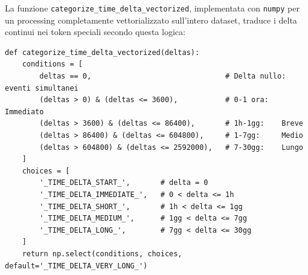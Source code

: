 \begin{enumerate}
    \begin{table}[htbp]
        \centering
        \caption{Distribuzione empirica dei delta temporali nel dataset e corrispondente token di discretizzazione assegnato.}
        \label{tab:time_delta_distribution}
    \end{table}
    \FloatBarrier

    La funzione \texttt{categorize\_time\_delta\_vectorized}, implementata con \texttt{numpy} per un processing completamente vettorializzato sull'intero dataset, traduce i delta continui nei token speciali secondo questa logica:

\begin{verbatim}
def categorize_time_delta_vectorized(deltas):
    conditions = [
        deltas == 0,                               # Delta nullo: eventi simultanei
        (deltas > 0) & (deltas <= 3600),           # 0-1 ora:   Immediato
        (deltas > 3600) & (deltas <= 86400),       # 1h-1gg:    Breve
        (deltas > 86400) & (deltas <= 604800),     # 1-7gg:     Medio
        (deltas > 604800) & (deltas <= 2592000),   # 7-30gg:    Lungo
    ]
    choices = [
        '_TIME_DELTA_START_',       # delta = 0
        '_TIME_DELTA_IMMEDIATE_',   # 0 < delta <= 1h
        '_TIME_DELTA_SHORT_',       # 1h < delta <= 1gg
        '_TIME_DELTA_MEDIUM_',      # 1gg < delta <= 7gg
        '_TIME_DELTA_LONG_',        # 7gg < delta <= 30gg
    ]
    return np.select(conditions, choices, default='_TIME_DELTA_VERY_LONG_')
\end{verbatim}


\end{enumerate}
